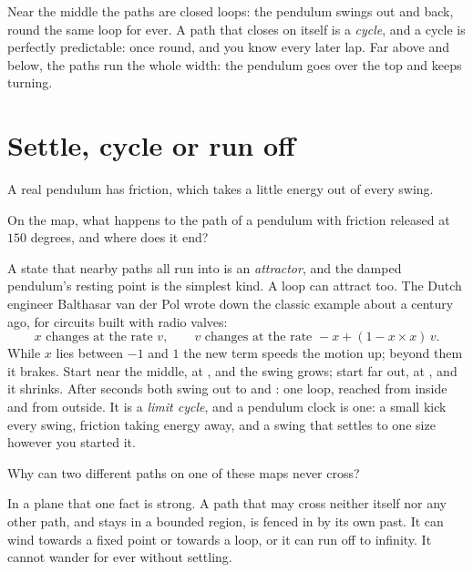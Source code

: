 \noindent
Near the middle the paths are closed loops: the pendulum swings out and back,
round the same loop for ever. A path that closes on itself is a
\emph{cycle}, and a cycle is perfectly predictable: once round, and you know
every later lap. Far above and below, the paths run the whole width: the
pendulum goes over the top and keeps turning.

\section{Settle, cycle or run off}
\label{sec:ch04-settle}

\noindent
A real pendulum has friction, which takes a little energy out of every swing.

\begin{think}
On the map, what happens to the path of a pendulum with friction released at
$150$ degrees, and where does it end?
\end{think}
A state that nearby paths all run into is an \emph{attractor}, and the
damped pendulum's resting point is the simplest kind. A loop can attract too.
The Dutch engineer Balthasar van der Pol wrote down the classic example about
a century ago, for circuits built with radio valves:
\[ x \text{ changes at the rate } v, \qquad
   v \text{ changes at the rate } -x + (1 - x \times x)\, v. \]
While $x$ lies between $-1$ and $1$ the new term speeds the motion up; beyond
them it brakes. Start near the middle, at , and the
swing grows; start far out, at , and it shrinks. After
 seconds both swing out to  and
: one loop, reached from inside and from outside. It
is a \emph{limit cycle}, and a pendulum clock is one: a small kick every
swing, friction taking energy away, and a swing that settles to one size
however you started it.


\begin{think}
Why can two different paths on one of these maps never cross?
\end{think}
In a plane that one fact is strong. A path that may cross neither itself nor
any other path, and stays in a bounded region, is fenced in by its own past.
It can wind towards a fixed point or towards a loop, or it can run off to
infinity. It cannot wander for ever without settling.

